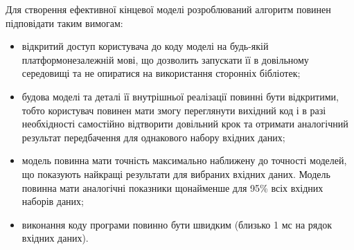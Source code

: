 Для створення ефективної кінцевої моделі розроблюваний алгоритм повинен підповідати таким вимогам:
\begin{itemize}  
	\item відкритий доступ користувача до коду моделі на будь-якій платформонезалежній мові, що дозволить запускати її в довільному середовищі та не опиратися на використання сторонніх бібліотек;
	\item будова моделі та деталі її внутрішньої реалізації повинні бути відкритими, тобто користувач повинен мати змогу переглянути вихідний код і в разі необхідності самостійно відтворити довільний крок та отримати аналогічний результат передбачення для однакового набору вхідних даних;
	\item модель повинна мати точність максимально наближену до точності моделей, що показують найкращі результати для вибраних вхідних даних. Модель повинна мати аналогічні показники щонайменше для 95\% всіх вхідних наборів даних;
	\item виконання коду програми повинно бути швидким (близько 1 мс на рядок вхідних даних).
\end{itemize}